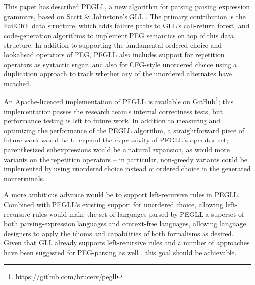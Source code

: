 \documentclass{article}
\begin{document}
This paper has described PEGLL, a new algorithm for parsing parsing expression grammars, based on Scott \& Johnstone's GLL \cite{SJ10,SJ16}. 
The primary contribution is the FailCRF data structure, which adds failure paths to GLL's call-return forest, and code-generation algorithms to implement PEG semantics on top of this data structure. 
In addition to supporting the fundamental ordered-choice and lookahead operators of PEG, PEGLL also includes support for repetition operators as syntactic sugar, and also for CFG-style unordered choice using a duplication approach to track whether any of the unordered alternates have matched. 

An Apache-licenced implementation of PEGLL is available on GitHub\footnote{\url{https://github.com/bruceiv/pegll}}; this implementation passes the research team's internal correctness tests, but performance testing is left to future work. 
In addition to measuring and optimizing the performance of the PEGLL algorithm, a straightforward piece of future work would be to expand the expressivity of PEGLL's operator set; parenthesized subexpressions would be a natural expansion, as would more variants on the repetition operators -- in particular, non-greedy variants could be implemented by using unordered choice instead of ordered choice in the generated nonterminals. 

A more ambitious advance would be to support left-recursive rules in PEGLL. 
Combined with PEGLL's existing support for unordered choice, allowing left-recursive rules would make the set of languages parsed by PEGLL a superset of both parsing-expression languages and context-free languages, allowing language designers to apply the idioms and capabilities of both formalisms as desired. 
Given that GLL already supports left-recursive rules \cite{SJ10} and a number of approaches have been suggested for PEG-parsing as well \cite{MMI14left,Hut20,Red21}, this goal should be achievable.



\end{document}
